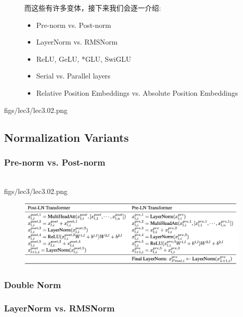 \begin{figure}[htbp]
\begin{minipage}{0.5\linewidth}
\begin{itemize}
    \end{itemize}
    而这些有许多变体，接下来我们会逐一介绍:
    \begin{itemize}
        \item Pre-norm vs. Post-norm
        \item LayerNorm vs. RMSNorm
        \item ReLU, GeLU, *GLU, SwiGLU
        \item Serial vs. Parallel layers
        \item Relative Position Embeddings vs. Absolute Position Embeddings
    \end{itemize}
  \end{minipage}
\end{figure}


\MarginImageWithNote
  {figs/lec3/lec3.02.png}
  {}


\clearpage
\subsection{Normalization Variants}
\subsubsection{Pre-norm vs. Post-norm}~{}
\\
\MarginImageWithNote
  {figs/lec3/lec3.02.png}
  {}


\begin{figure}[htbp]
  \centering
  \includegraphics[width=1\linewidth]{figs/lec3/lec3.04.png}
  \caption{}
  \label{fig:}
\end{figure}





\subsubsection{Double Norm}

\subsubsection{LayerNorm vs. RMSNorm}





